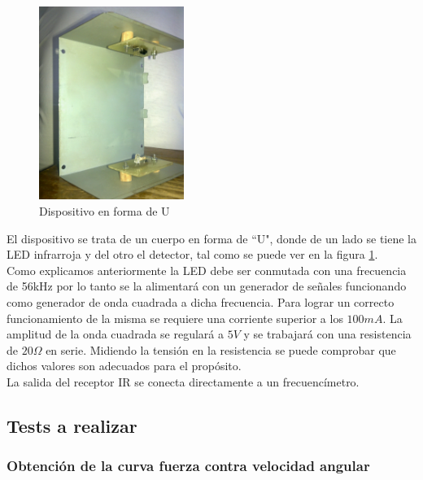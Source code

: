 \documentclass[spanish,12pt,a4paper,titlepage]{report}
\begin{document}
\begin{figure}
  \vspace{-20pt}
  \begin{center}
    \includegraphics[width=0.42\textwidth]{./Pics/u.jpg}
  \end{center}
  \vspace{-20pt}
  \caption{Dispositivo en forma de U}
  \label{fig:u}
  \vspace{-10pt}
\end{figure}

El dispositivo se trata de un cuerpo en forma de ``U", donde de un lado se tiene la LED infrarroja y del otro el detector, tal como se puede ver en la figura \ref{fig:u}.\\

Como explicamos anteriormente la LED debe ser conmutada con una frecuencia de 56kHz por lo tanto se la alimentará con un generador de señales funcionando como generador de onda cuadrada a dicha frecuencia. Para lograr un correcto funcionamiento de la misma se requiere una corriente superior a los $100mA$. La amplitud de la onda cuadrada se regulará a $5V$ y se trabajará con una resistencia de $20\Omega$ en serie. Midiendo la tensión en la resistencia se puede comprobar que dichos valores son adecuados para el propósito.\\

La salida del receptor IR se conecta directamente a un frecuencímetro.\\

\subsection{Tests a realizar}

\subsubsection*{Obtención de la curva fuerza contra velocidad angular}
\end{document}
